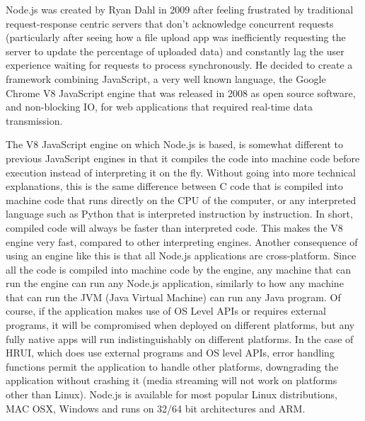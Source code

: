 Node.js was created by Ryan Dahl in 2009 after feeling frustrated by traditional request-response centric servers that don't acknowledge concurrent requests (particularly after seeing how a file upload app was inefficiently requesting the server to update the percentage of uploaded data\cite{nodesummit12}) and constantly lag the user experience waiting for requests to process synchronously. He decided to create a framework combining JavaScript, a very well known language, the Google Chrome V8 JavaScript engine that was released in 2008 as open source software, and non-blocking IO, for web applications that required real-time data transmission.

The V8 JavaScript engine on which Node.js is based, is somewhat different to previous JavaScript engines in that it compiles the code into machine code before execution instead of interpreting it on the fly. Without going into more technical explanations, this is the same difference between C code that is compiled into machine code that runs directly on the CPU of the computer, or any interpreted language such as Python that is interpreted instruction by instruction. In short, compiled code will always be faster than interpreted code. This makes the V8 engine very fast, compared to other interpreting engines. Another consequence of using an engine like this is that all Node.js applications are cross-platform. Since all the code is compiled into machine code by the engine, any machine that can run the engine can run any Node.js application, similarly to how any machine that can run the JVM (Java Virtual Machine) can run any Java program. Of course, if the application makes use of OS Level APIs or requires external programs, it will be compromised when deployed on different platforms, but any fully native apps will run indistinguishably on different platforms. In the case of HRUI, which does use external programs and OS level APIs, error handling functions permit the application to handle other platforms, downgrading the application without crashing it (media streaming will not work on platforms other than Linux). Node.js is available for most popular Linux distributions, MAC OSX, Windows and runs on 32/64 bit architectures and ARM.\\

